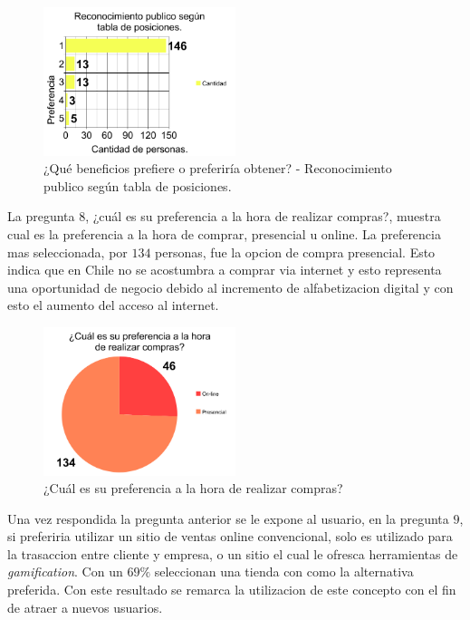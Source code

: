 \begin{figure}[!htb]
  \centering
  \includegraphics[width=0.5\textwidth]{images/chartPreg7_4.png}
  \caption[chart7-4]{¿Qué beneficios prefiere o preferiría obtener? - Reconocimiento publico según tabla de posiciones.}
  \label{fig:chart2}
\end{figure}

La pregunta $8$, ¿cuál es su preferencia a la hora de realizar compras?, muestra cual es la preferencia 
a la hora de comprar, presencial u online. La preferencia mas seleccionada, por $134$ personas, 
fue la opcion de compra presencial. Esto indica que en Chile no se acostumbra a comprar via internet 
y esto representa una oportunidad de negocio debido al incremento de alfabetizacion digital y 
con esto el aumento del acceso al internet.

\begin{figure}[!htb]
  \centering
  \includegraphics[width=0.5\textwidth]{images/chartPreg8.png}
  \caption[chart8]{¿Cuál es su preferencia a la hora de realizar compras?}
  \label{fig:chart2}
\end{figure}

Una vez respondida la pregunta anterior se le expone al usuario, en la pregunta $9$, si preferiria
utilizar un sitio de ventas online convencional, solo es utilizado para la trasaccion entre cliente
y empresa, o un sitio el cual le ofresca herramientas de \emph{gamification}. Con un $69\%$ seleccionan
una tienda con {\GAM} como la alternativa preferida. Con este resultado se remarca la
utilizacion de este concepto con el fin de atraer a nuevos usuarios.

